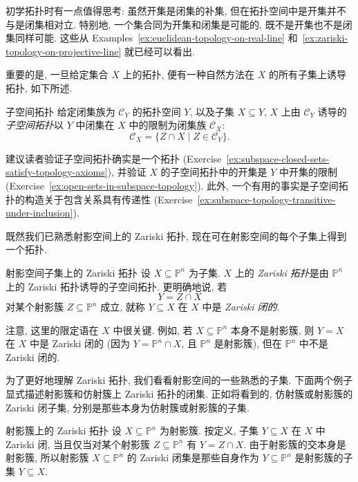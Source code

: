 初学拓扑时有一点值得思考: 虽然开集是闭集的补集, 但在拓扑空间中是开集并不与是闭集相对立. 特别地, 一个集合同为开集和闭集是可能的, 既不是开集也不是闭集同样可能. 这些从 Examples~\ref{ex:euclidean-topology-on-real-line} 和~\ref{ex:zariski-topology-on-projective-line} 就已经可以看出.

重要的是, 一旦给定集合 $X$ 上的拓扑, 便有一种自然方法在 $X$ 的所有子集上诱导拓扑, 如下所述.

\begin{Definition}{子空间拓扑}\leavevmode\label{def:subspace-topology}
给定闭集族为 $\mathcal{C}_{Y}$ 的拓扑空间 $Y$, 以及子集 $X\subseteq Y$, $X$ 上由 $\mathcal{C}_{Y}$ 诱导的\emph{子空间拓扑}以 $Y$ 中闭集在 $X$ 中的限制为闭集族 $\mathcal{C}_{X}$:
\[
  \mathcal{C}_{X}=\{Z\cap X\mid Z\in\mathcal{C}_{Y}\}.
\]
\end{Definition}

建议读者验证子空间拓扑确实是一个拓扑 (Exercise~\ref{ex:subspace-closed-sets-satisfy-topology-axioms}), 并验证 $X$ 的子空间拓扑中的开集是 $Y$ 中开集的限制 (Exercise~\ref{ex:open-sets-in-subspace-topology}). 此外, 一个有用的事实是子空间拓扑的构造关于包含关系具有传递性 (Exercise~\ref{ex:subspace-topology-transitive-under-inclusion}).

既然我们已熟悉射影空间上的 Zariski 拓扑, 现在可在射影空间的每个子集上得到一个拓扑.

\begin{Definition}{射影空间子集上的 Zariski 拓扑}\leavevmode\label{def:zariski-topology-on-projective-subset}
设 $X\subseteq\mathbb{P}^{n}$ 为子集. $X$ 上的 \emph{Zariski 拓扑}是由 $\mathbb{P}^{n}$ 上的 Zariski 拓扑诱导的子空间拓扑. 更明确地说, 若
\[
  Y=Z\cap X
\]
对某个射影簇 $Z\subseteq\mathbb{P}^{n}$ 成立, 就称 $Y\subseteq X$ 在 $X$ 中是 \emph{Zariski 闭的}.
\end{Definition}

注意, 这里的限定语\textquotedbl{}在 $X$ 中\textquotedbl{}很关键. 例如, 若 $X\subseteq\mathbb{P}^{n}$ 本身不是射影簇, 则 $Y=X$ 在 $X$ 中是 Zariski 闭的 (因为 $Y=\mathbb{P}^{n}\cap X$, 且 $\mathbb{P}^{n}$ 是射影簇), 但在 $\mathbb{P}^{n}$ 中不是 Zariski 闭的.

为了更好地理解 Zariski 拓扑, 我们看看射影空间的一些熟悉的子集. 下面两个例子显式描述射影簇和仿射簇上 Zariski 拓扑的闭集. 正如将看到的, 仿射簇或射影簇的 Zariski 闭子集, 分别是那些本身为仿射簇或射影簇的子集.

\begin{Example}{射影簇上的 Zariski 拓扑}\leavevmode\label{ex:zariski-topology-on-projective-varieties}
设 $X\subseteq\mathbb{P}^{n}$ 为射影簇. 按定义, 子集 $Y\subseteq X$ 在 $X$ 中 Zariski 闭, 当且仅当对某个射影簇 $Z\subseteq\mathbb{P}^{n}$ 有 $Y=Z\cap X$. 由于射影簇的交本身是射影簇, 所以射影簇 $X\subseteq\mathbb{P}^{n}$ 的 Zariski 闭集是那些自身作为 $Y\subseteq\mathbb{P}^{n}$ 是射影簇的子集 $Y\subseteq X$.
\end{Example}

